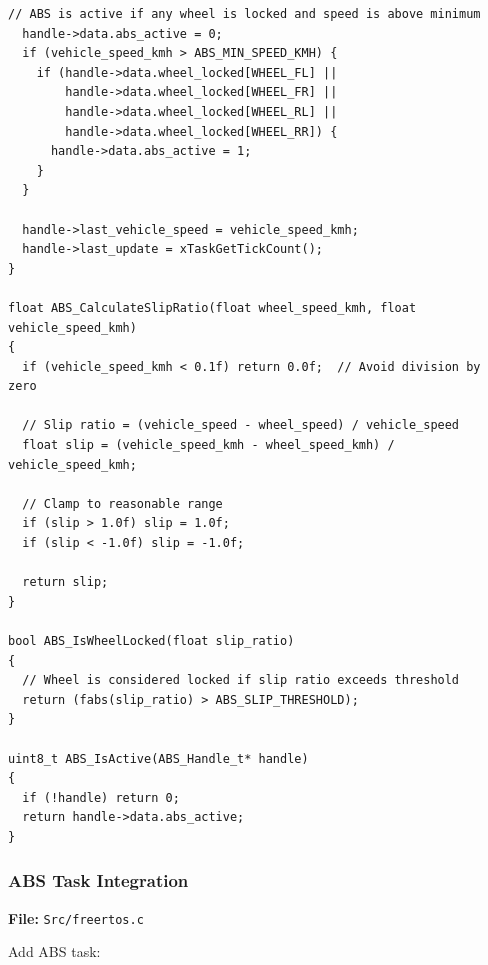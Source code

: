 \documentclass[11pt,a4paper]{article}
\begin{document}
\begin{lstlisting}[caption=ABS System Implementation, label=lst:absc]
  // ABS is active if any wheel is locked and speed is above minimum
  handle->data.abs_active = 0;
  if (vehicle_speed_kmh > ABS_MIN_SPEED_KMH) {
    if (handle->data.wheel_locked[WHEEL_FL] ||
        handle->data.wheel_locked[WHEEL_FR] ||
        handle->data.wheel_locked[WHEEL_RL] ||
        handle->data.wheel_locked[WHEEL_RR]) {
      handle->data.abs_active = 1;
    }
  }
  
  handle->last_vehicle_speed = vehicle_speed_kmh;
  handle->last_update = xTaskGetTickCount();
}

float ABS_CalculateSlipRatio(float wheel_speed_kmh, float vehicle_speed_kmh)
{
  if (vehicle_speed_kmh < 0.1f) return 0.0f;  // Avoid division by zero
  
  // Slip ratio = (vehicle_speed - wheel_speed) / vehicle_speed
  float slip = (vehicle_speed_kmh - wheel_speed_kmh) / vehicle_speed_kmh;
  
  // Clamp to reasonable range
  if (slip > 1.0f) slip = 1.0f;
  if (slip < -1.0f) slip = -1.0f;
  
  return slip;
}

bool ABS_IsWheelLocked(float slip_ratio)
{
  // Wheel is considered locked if slip ratio exceeds threshold
  return (fabs(slip_ratio) > ABS_SLIP_THRESHOLD);
}

uint8_t ABS_IsActive(ABS_Handle_t* handle)
{
  if (!handle) return 0;
  return handle->data.abs_active;
}
\end{lstlisting}

\subsubsection{ABS Task Integration}

\textbf{File:} \texttt{Src/freertos.c}

Add ABS task:
\end{document}
